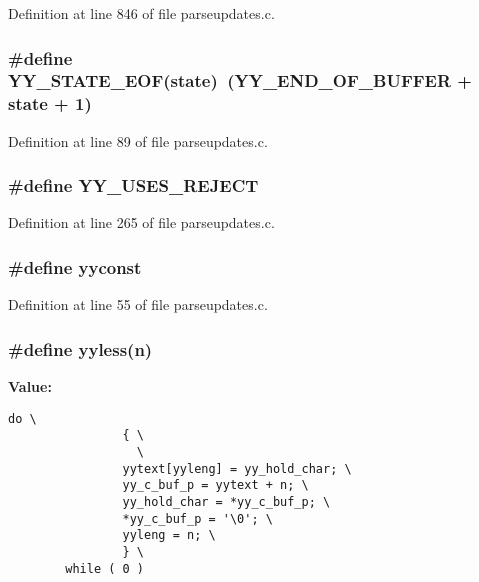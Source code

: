 Definition at line 846 of file parseupdates.c.
\subsubsection{\setlength{\rightskip}{0pt plus 5cm}\#define YY\_\-STATE\_\-EOF(state)\ (YY\_\-END\_\-OF\_\-BUFFER + state + 1)}\label{parseupdates_8c_a10}




Definition at line 89 of file parseupdates.c.
\subsubsection{\setlength{\rightskip}{0pt plus 5cm}\#define YY\_\-USES\_\-REJECT}\label{parseupdates_8c_a28}




Definition at line 265 of file parseupdates.c.
\subsubsection{\setlength{\rightskip}{0pt plus 5cm}\#define yyconst}\label{parseupdates_8c_a3}




Definition at line 55 of file parseupdates.c.
\subsubsection{\setlength{\rightskip}{0pt plus 5cm}\#define yyless(n)}\label{parseupdates_8c_a59}


{\bf Value:}

\footnotesize\begin{verbatim}do \
                { \
                  \
                yytext[yyleng] = yy_hold_char; \
                yy_c_buf_p = yytext + n; \
                yy_hold_char = *yy_c_buf_p; \
                *yy_c_buf_p = '\0'; \
                yyleng = n; \
                } \
        while ( 0 )
\end{verbatim}\normalsize 


